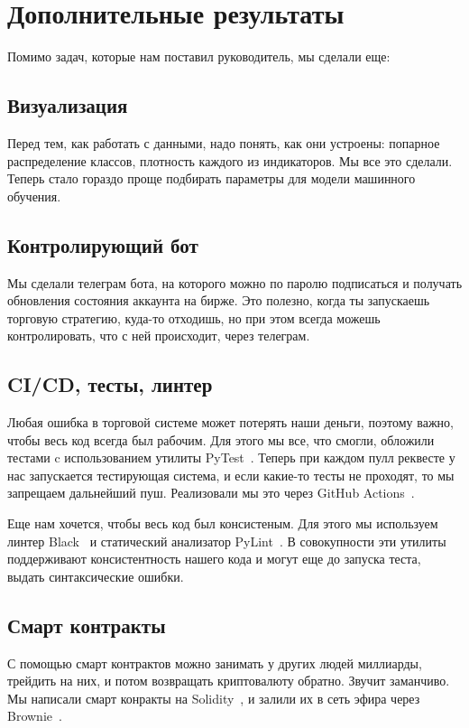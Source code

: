 \section{Дополнительные результаты}

Помимо задач, которые нам поставил руководитель, мы сделали еще:

\subsection{Визуализация}
Перед тем, как работать с данными, надо понять, как они устроены: попарное распределение классов, плотность каждого из индикаторов. Мы все это сделали. Теперь стало гораздо проще подбирать параметры для модели машинного обучения.

\subsection{Контролирующий бот}
Мы сделали телеграм бота, на которого можно по паролю подписаться и получать обновления состояния аккаунта на бирже. Это полезно, когда ты запускаешь торговую стратегию, куда-то отходишь, но при этом всегда можешь контролировать, что с ней происходит, через телеграм.

\subsection{CI/CD, тесты, линтер}
Любая ошибка в торговой системе может потерять наши деньги, поэтому важно, чтобы весь код всегда был рабочим. Для этого мы все, что смогли, обложили тестами c использованием утилиты PyTest~\cite{Pytest}. Теперь при каждом пулл реквесте у нас запускается тестирующая система, и если какие-то тесты не проходят, то мы запрещаем дальнейший пуш. Реализовали мы это через GitHub Actions~\cite{GitHubActions}.

Еще нам хочется, чтобы весь код был консистеным. Для этого мы используем линтер Black~\cite{Black} и статический анализатор PyLint~\cite{Pylint}. В совокупности эти утилиты поддерживают консистентность нашего кода и могут еще до запуска теста, выдать синтаксические ошибки.

\subsection{Смарт контракты}
С помощью смарт контрактов можно занимать у других людей миллиарды, трейдить на них, и потом возвращать криптовалюту обратно. Звучит заманчиво. Мы написали смарт конракты на Solidity~\cite{Solidity}, и залили их в сеть эфира через Brownie~\cite{Brownie}.